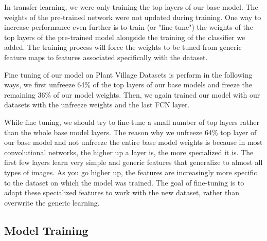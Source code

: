 In transfer learning, we were only training the top layers of our base model. The weights of the pre-trained network were not updated during training. One way to increase performance even further is to train (or "fine-tune") the weights of the top layers of the pre-trained model alongside the training of the classifier we added. The training process will force the weights to be tuned from generic feature maps to features associated specifically with the dataset.\par\vspace{1em}

Fine tuning of our model on Plant Village Datasets is perform in the following ways, we first unfreeze 64\% of the top layers of our base models and freeze the remaining 36\% of our model weights. Then, we again trained our model with our datasets with the unfreeze weights and the last FCN layer. \par\vspace{1em}

While fine tuning, we should try to fine-tune a small number of top layers rather than the whole base model layers. 
The reason why we unfreeze 64\% top layer of our base model and not unfreeze the entire base model weights is because in most convolutional networks, the higher up a layer is, the more specialized it is. The first few layers learn very simple and generic features that generalize to almost all types of images. As you go higher up, the features are increasingly more specific to the dataset on which the model was trained. The goal of fine-tuning is to adapt these specialized features to work with the new dataset, rather than overwrite the generic learning.\par\vspace{1em}

\subsection{Model Training}

